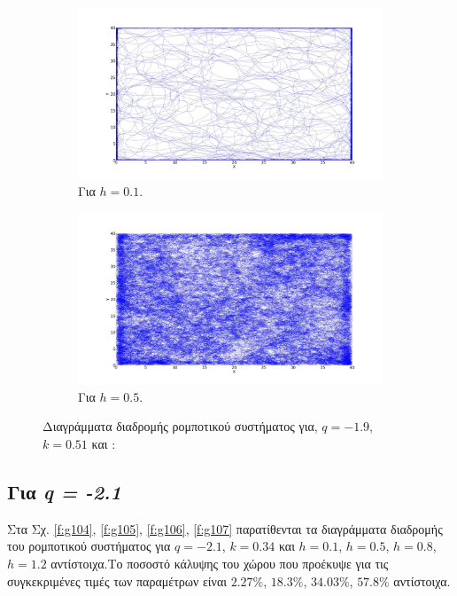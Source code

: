 \begin{figure}[ht]
	\centering
	\begin{subfigure}[b]{0.55\textwidth}
		\centering
		\includegraphics[width=\textwidth]{LateX images/log/h/g1-1.9}
		\caption{Για $h =0.1$.}
		\label{f:g102}
	\end{subfigure}
	\hfill
	\begin{subfigure}[b]{0.55\textwidth}
		\centering
		\includegraphics[width=\textwidth]{LateX images/log/h/g2-1.9}
		\caption{Για $h =0.5$.}
		\label{f:g103}
	\end{subfigure}
	\hfill
	\caption{Διαγράμματα διαδρομής ρομποτικού συστήματος για, $q = -1.9$, $k = 0.51$ και :}
\end{figure}

\clearpage

\subsection{Για \emph{q = -2.1}}

Στα Σχ. \ref{f:g104}, \ref{f:g105}, \ref{f:g106}, \ref{f:g107} παρατίθενται τα διαγράμματα διαδρομής του ρομποτικού συστήματος για $q = -2.1$, $k = 0.34$ και $h =0.1$, $h =0.5$, $h =0.8$, $h =1.2$ αντίστοιχα.Tο ποσοστό κάλυψης του χώρου που προέκυψε για τις συγκεκριμένες τιμές των παραμέτρων είναι $2.27\%$, $18.3\%$, $34.03\%$, $57.8\%$ αντίστοιχα.


